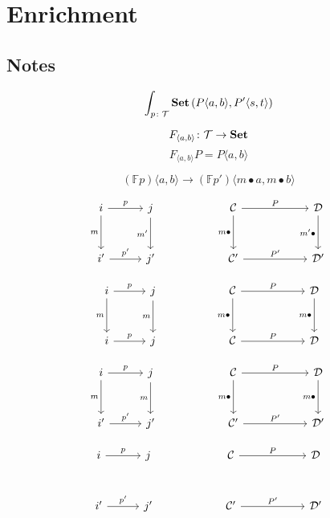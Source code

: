 \documentclass[DaoFP]{subfiles}
\begin{document}
\setcounter{chapter}{19}

\chapter{Enrichment}

\section{Notes}

\[ \int_{p \colon \mathcal{T}} \mathbf{Set}\left(P\langle a, b \rangle, P'\langle s, t \rangle\right) \]

\[F_{ \langle a, b\rangle} \colon \mathcal{T} \to \mathbf{Set} \]
\[ F_{ \langle a, b\rangle} P = P \langle a, b\rangle \]

\[ (\mathbb F p) \langle a, b \rangle \to  (\mathbb F p') \langle m \bullet a, m \bullet b \rangle \]

\[
\begin{tikzcd} [row sep=1cm, column sep=1cm]
i 
\arrow[d, "{m}"']
\arrow[r, "p"]
& j
\arrow[d, "{m'}"']
&& \cat C
 \arrow[rr, "P", "" {name=ID, below} ]
 \arrow[d,  "{m \bullet}"']
 && \cat D
  \arrow[d, "{m' \bullet}"']
\\
 i'
\arrow[r, "p'"]
 & j'
 && \cat{C'}
  \arrow[rr, "P'", "" ]
&& \cat{D'}
  \end{tikzcd}
\]


\[
\begin{tikzcd} [row sep=1cm, column sep=1cm]
i 
\arrow[d, "{m}"']
\arrow[r, "p"]
& j
\arrow[d, "{m}"']
&& \cat C
 \arrow[rr, "P", "" {name=ID, below} ]
 \arrow[d,  "{m \bullet}"']
 && \cat D
  \arrow[d, "{m \bullet}"']
\\
 i
\arrow[r, "p"]
 & j
 && \cat{C}
  \arrow[rr, "P", "" ]
&& \cat{D}
  \end{tikzcd}
\]

\[
\begin{tikzcd} [row sep=1cm, column sep=1cm]
i 
\arrow[d, "{m}"']
\arrow[r, "p"]
& j
\arrow[d, "{m}"']
&& \cat C
 \arrow[rr, "P", "" {name=ID, below} ]
 \arrow[d,  "{m \bullet}"']
 && \cat D
  \arrow[d, "{m \bullet}"']
\\
 i'
\arrow[r, "p'"]
 & j'
 && \cat{C'}
  \arrow[rr, "P'", "" ]
&& \cat{D'}
  \end{tikzcd}
\]


\[
\begin{tikzcd} [row sep=1cm, column sep=1cm]
i 
\arrow[r, "p"]
& j
&& \cat C
 \arrow[rr, "P", "" {name=ID, below} ]
 && \cat D
\\
 i'
\arrow[r, "p'"]
 & j'
 && \cat{C'}
  \arrow[rr, "P'", "" ]
&& \cat{D'}
  \end{tikzcd}
\]
\end{document}
